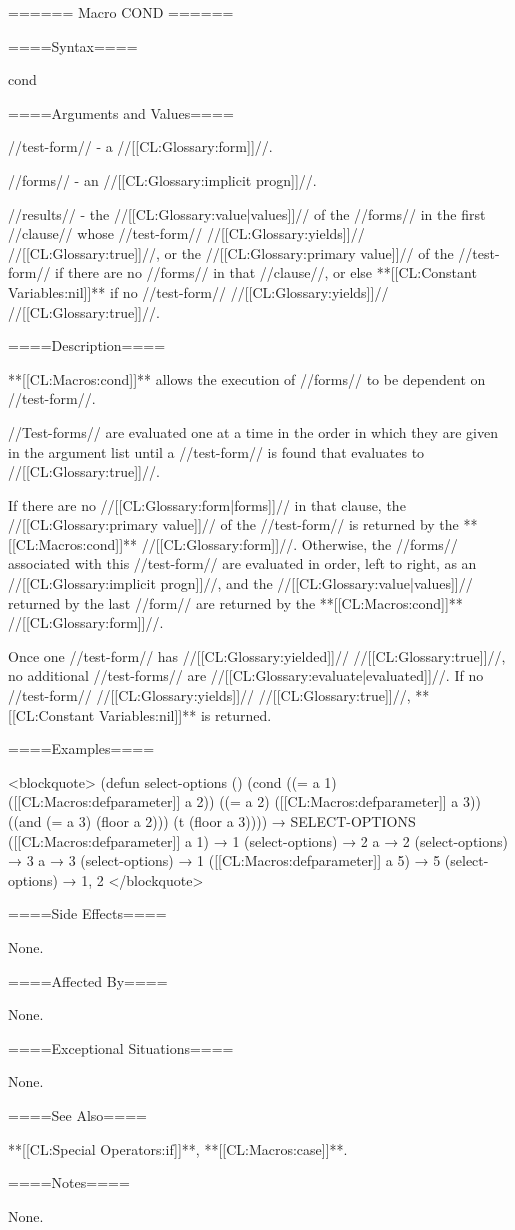 ====== Macro COND ======

====Syntax====

\DefmacWithValues cond {} {}


====Arguments and Values====

//test-form// - a //[[CL:Glossary:form]]//.

//forms// - an //[[CL:Glossary:implicit progn]]//.

//results// - the //[[CL:Glossary:value|values]]// of the //forms// in the first //clause// whose //test-form// //[[CL:Glossary:yields]]// //[[CL:Glossary:true]]//, or the //[[CL:Glossary:primary value]]// of the //test-form// if there are no //forms// in that //clause//, or else **[[CL:Constant Variables:nil]]** if no //test-form// //[[CL:Glossary:yields]]// //[[CL:Glossary:true]]//.

====Description====

**[[CL:Macros:cond]]** allows the execution of //forms// to be dependent on //test-form//.

//Test-forms// are evaluated one at a time in the order in which they are given in the argument list until a //test-form// is found that evaluates to //[[CL:Glossary:true]]//.

If there are no //[[CL:Glossary:form|forms]]// in that clause, the //[[CL:Glossary:primary value]]// of the //test-form// is returned by the **[[CL:Macros:cond]]** //[[CL:Glossary:form]]//. Otherwise, the //forms// associated with this //test-form// are evaluated in order, left to right, as an //[[CL:Glossary:implicit progn]]//, and the //[[CL:Glossary:value|values]]// returned by the last //form// are returned by the **[[CL:Macros:cond]]** //[[CL:Glossary:form]]//.

Once one //test-form// has //[[CL:Glossary:yielded]]// //[[CL:Glossary:true]]//, no additional //test-forms// are //[[CL:Glossary:evaluate|evaluated]]//. If no //test-form// //[[CL:Glossary:yields]]// //[[CL:Glossary:true]]//, **[[CL:Constant Variables:nil]]** is returned.

====Examples====

<blockquote> (defun select-options () (cond ((= a 1) ([[CL:Macros:defparameter]] a 2)) ((= a 2) ([[CL:Macros:defparameter]] a 3)) ((and (= a 3) (floor a 2))) (t (floor a 3)))) → SELECT-OPTIONS ([[CL:Macros:defparameter]] a 1) → 1 (select-options) → 2 a → 2 (select-options) → 3 a → 3 (select-options) → 1 ([[CL:Macros:defparameter]] a 5) → 5 (select-options) → 1, 2 </blockquote>

====Side Effects====

None.

====Affected By====

None.

====Exceptional Situations====

None.

====See Also====

**[[CL:Special Operators:if]]**, **[[CL:Macros:case]]**.

====Notes====

None.



